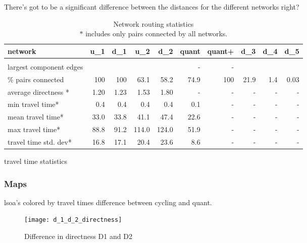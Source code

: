 There's got to be a significant difference between the distances for the different networks right?


\begin{table}[]
\begin{tabular}{lrrrrrrrrr}
\toprule
network                  & u\_1    & d\_1    & u\_2  & d\_2  & quant & quant+ & d\_3 & d\_4 & d\_5 \\ \hline
                         &         &         &       &       &       &        &      &      &      \\
largest component edges  &         &         &       &       &  -    & -      &      &      &      \\
\% pairs connected       & 100     & 100     &  63.1 & 58.2  & 74.9  & 100    & 21.9 & 1.4  & 0.03 \\
average directness *     & 1.20    & 1.23    & 1.53  & 1.80  & -     & -      & -    & -    & -    \\
min travel time*         & 0.4     & 0.4     & 0.4   & 0.4   & 0.1   & -      & -    & -    & -    \\
mean travel time*        & 33.0    & 33.8    & 41.1  & 47.4  & 22.6  & -      & -    & -    & -    \\
max travel time*         & 88.8    & 91.2    & 114.0 & 124.0 & 51.9  & -      & -    & -    & -    \\
travel time std. dev*    & 16.8    & 17.1    & 20.4  & 23.6  & 8.6   & -      & -    & -    & -   \\ \bottomrule
\end{tabular}
\caption{Network routing statistics \\ $*$ includes only pairs connected by all networks.}
\label{table:travel_time_stats}
\end{table}

\begin{table}
\centering
\caption{travel time statistics}
\label{table:travel_time_stats}
\end{table}

\subsubsection{Maps}

lsoa's colored by travel times difference between cycling and quant. 

\begin{figure}
\centering
\texttt{[image: d\_1\_d\_2\_directness]}
\caption{Difference in directness D1 and D2}
\label{fig:d1_d2_directness}
\end{figure}


